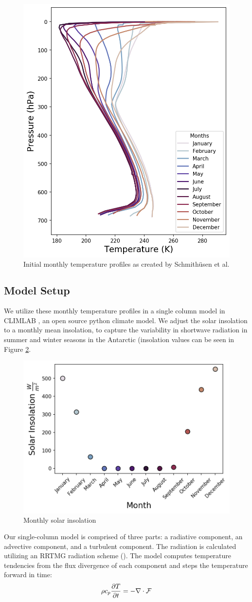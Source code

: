 \documentclass[12]{article}
\begin{document}
\begin{figure}[htb!]
\noindent\includegraphics[width=.5\textwidth]{figures/initial_temperature_profiles.png}
\centering
\caption{Initial monthly temperature profiles as created by Schmithüsen et al.}
\label{fig:temperature_profiles}
\end{figure}

\subsection{Model Setup}
We utilize these monthly temperature profiles in a single column model in CLIMLAB \citep{rose_climlab_2018}, an open source python climate model. We adjust the solar insolation to a monthly mean insolation, to capture the variability in shortwave radiation in summer and winter seasons in the Antarctic (insolation values can be seen in Figure \ref{fig:solar_insol}. 

\begin{figure}[htb!]
\noindent\includegraphics[width=.5\textwidth]{figures/solar_insol.png}
\centering
\caption{Monthly solar insolation }
\label{fig:solar_insol}
\end{figure}

Our single-column model is comprised of three parts: a radiative component, an advective component, and a turbulent component. The radiation is calculated utilizing an RRTMG radiation scheme (). The model computes temperature tendencies from the flux divergence of each component and steps the temperature forward in time:
\begin{equation}
    \rho c_{p} \pdv{T}{t} = -\nabla \cdot \mathbf{\mathcal{F}}
\end{equation}
\end{document}
